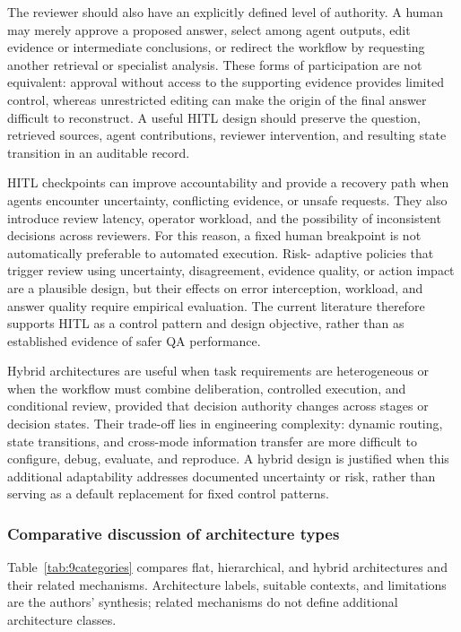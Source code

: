 \documentclass[a4paper,fleqn]{cas-dc}
\begin{document}
The reviewer should also have an explicitly defined level of authority. A
human may merely approve a proposed answer, select among agent outputs, edit
evidence or intermediate conclusions, or redirect the workflow by requesting
another retrieval or specialist analysis. These forms of participation are
not equivalent: approval without access to the supporting evidence provides
limited control, whereas unrestricted editing can make the origin of the
final answer difficult to reconstruct. A useful HITL design should preserve
the question, retrieved sources, agent contributions, reviewer intervention,
and resulting state transition in an auditable record.

HITL checkpoints can improve accountability and provide a recovery path when
agents encounter uncertainty, conflicting evidence, or unsafe requests. They
also introduce review latency, operator workload, and the possibility of
inconsistent decisions across reviewers. For this reason, a fixed human
breakpoint is not automatically preferable to automated execution. Risk-
adaptive policies that trigger review using uncertainty, disagreement,
evidence quality, or action impact are a plausible design, but their effects
on error interception, workload, and answer quality require empirical
evaluation. The current literature therefore supports HITL as a control
pattern and design objective, rather than as established evidence of safer QA
performance.



Hybrid architectures are useful when task requirements are heterogeneous or when the workflow must combine deliberation, controlled execution, and conditional review, provided that decision authority changes across stages or decision states. Their trade-off lies in engineering complexity: dynamic routing, state transitions, and cross-mode information transfer are more difficult to configure, debug, evaluate, and reproduce. A hybrid design is justified when this additional adaptability addresses documented uncertainty or risk, rather than serving as a default replacement for fixed control patterns.

\subsubsection{Comparative discussion of architecture types}
\label{sec:arch_comparison}

Table~\ref{tab:9categories} compares flat, hierarchical, and hybrid architectures
and their related mechanisms. Architecture labels, suitable contexts, and
limitations are the authors' synthesis; related mechanisms
do not define additional architecture classes.
\end{document}
